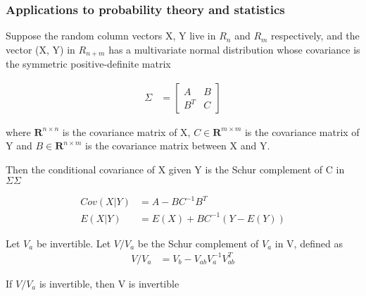 \subsubsection{Applications to probability theory and statistics}
Suppose the random column vectors X, Y live in $R_n$ and $R_m$ respectively, and the vector (X, Y) in $R_{n + m}$ has a multivariate normal distribution whose covariance is the symmetric positive-definite matrix

\begin{align*}
	\Sigma &= \begin{bmatrix}
		A & B \\
		B^T & C
	\end{bmatrix} 
\end{align*}

where $\mathbf{R} ^{n\times n}$ is the covariance matrix of X, ${ C\in \mathbf {R} ^{m\times m}}$ is the covariance matrix of Y and ${ B\in \mathbf {R} ^{n\times m}}$ is the covariance matrix between X and Y.

Then the conditional covariance of X given Y is the Schur complement of C in ${\textstyle \Sigma }{\textstyle \Sigma }$

\begin{align*}
	Cov(X|Y) &= A - B C^{-1}B^T \\
	E(X|Y) &= E(X) + B C^{-1} (Y- E(Y))
\end{align*}



Let $V_a$ be invertible. Let $V/V_a$ be the Schur complement of $V_a$ in V, defined as
\begin{align*}
	V/V_a &= V_b - V_{ab} V_{a}^{-1} V_{ab}^T
\end{align*}

If $V/V_a$ is invertible, then V is invertible 




